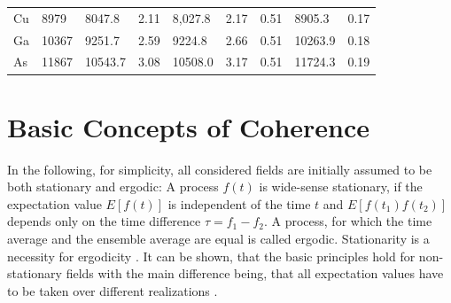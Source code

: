 \begin{table}
\begin{tabular}{l|l|ll|lll|ll}
		Cu      & 8979                                                   & 8047.8                                                & 2.11                                                 & 8,027.8                                                & 2.17                                                 & 0.51                                                      & 8905.3                                                & 0.17                                                      \\
		Ga      & 10367                                                  & 9251.7                                                 & 2.59                                                 & 9224.8                                                 & 2.66                                                 & 0.51                                                      & 10263.9                                               & 0.18                                                      \\
		As      & 11867                                                  & 10543.7                                                & 3.08                                                 & 10508.0                                                & 3.17                                                 & 0.51                                                      & 11724.3                                               & 0.19                                                      \\ \hline
	\end{tabular}
\end{table}

\section{Basic Concepts of Coherence}
In the following, for simplicity, all considered fields are initially assumed to be both stationary and ergodic: A process $f(t)$ is wide-sense stationary, if the expectation value $E[f(t)]$ is independent of the time $t$ and $E[f(t_1)f(t_2)]$ depends only on the time difference $\tau=f_1-f_2$. A process, for which the time average and the ensemble average are equal is called ergodic. Stationarity is a necessity for ergodicity \cite{goodman2000}. It can be shown, that the basic principles hold for non-stationary fields with the main difference being, that all expectation values have to be taken over different realizations \cite{lajunen04}.

